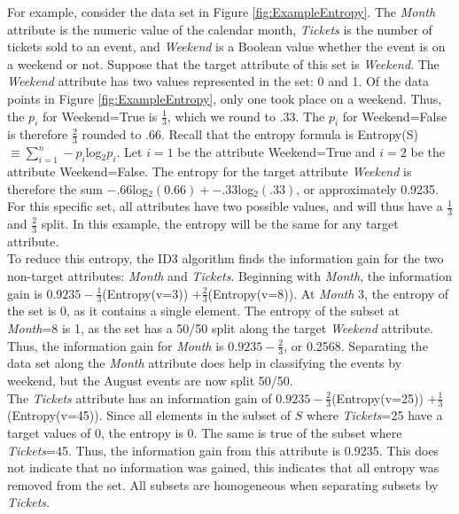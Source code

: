 For example, consider the data set in Figure \ref{fig:ExampleEntropy}. The \textit{Month} attribute is the numeric value of the calendar month, \textit{Tickets} is the number of tickets sold to an event, and \textit{Weekend} is a Boolean value whether the event is on a weekend or not. Suppose that the target attribute of this set is \textit{Weekend}. The \textit{Weekend} attribute has two values represented in the set: 0 and 1. Of the data points in Figure \ref{fig:ExampleEntropy}, only one took place on a weekend. Thus, the $p_i$ for Weekend=True is $\frac{1}{3}$, which we round to $.33$. The $p_i$ for Weekend=False is therefore $\frac{2}{3}$ rounded to $.66$. Recall that the entropy formula is Entropy(S)$\equiv\sum_{i=1}^n-p_i$log$_2p_i$. Let $i=1$ be the attribute Weekend=True and $i=2$ be the attribute Weekend=False. The entropy for the target attribute \textit{Weekend} is therefore the sum $-.66$log$_2(0.66) + -.33$log$_2(.33)$, or approximately 0.9235. For this specific set, all attributes have two possible values, and will thus have a $\frac{1}{3}$ and $\frac{2}{3}$ split. In this example, the entropy will be the same for any target attribute.\\

To reduce this entropy, the ID3 algorithm finds the information gain for the two non-target attributes: \textit{Month} and \textit{Tickets}. Beginning with \textit{Month}, the information gain is $0.9235 - \frac{1}{3}$(Entropy(v=3)) $+ \frac{2}{3}$(Entropy(v=8)). At \textit{Month} 3, the entropy of the set is 0, as it contains a single element. The entropy of the subset at \textit{Month}=8 is 1, as the set has a 50/50 split along the target \textit{Weekend} attribute. Thus, the information gain for \textit{Month} is $0.9235 - \frac{2}{3}$, or 0.2568. Separating the data set along the \textit{Month} attribute does help in classifying the events by weekend, but the August events are now split 50/50.\\

The \textit{Tickets} attribute has an information gain of $0.9235 - \frac{2}{3}$(Entropy(v=25)) $+ \frac{1}{3}$(Entropy(v=45)). Since all elements in the subset of $S$ where \textit{Tickets}=25 have a target values of 0, the entropy is 0. The same is true of the subset where \textit{Tickets}=45. Thus, the information gain from this attribute is 0.9235. This does not indicate that no information was gained, this indicates that all entropy was removed from the set. All subsets are homogeneous when separating subsets by \textit{Tickets}.

